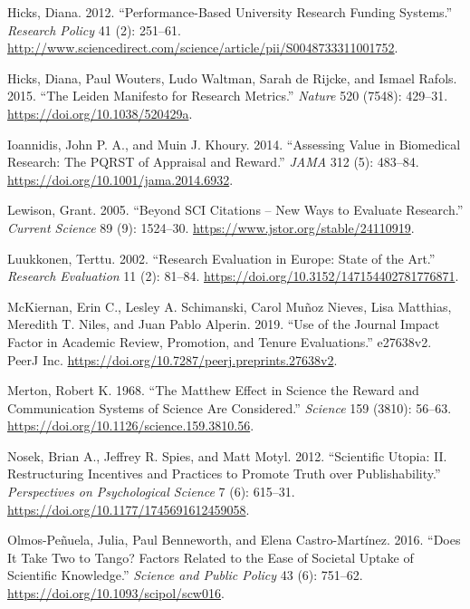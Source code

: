 \documentclass[]{elsarticle} %
\begin{document}
\leavevmode\hypertarget{ref-hicksPerformancebasedUniversityResearch2012}{}%
Hicks, Diana. 2012. ``Performance-Based University Research Funding
Systems.'' \emph{Research Policy} 41 (2): 251--61.
\url{http://www.sciencedirect.com/science/article/pii/S0048733311001752}.

\leavevmode\hypertarget{ref-hicksLeidenManifestoResearch2015}{}%
Hicks, Diana, Paul Wouters, Ludo Waltman, Sarah de Rijcke, and Ismael
Rafols. 2015. ``The Leiden Manifesto for Research Metrics.''
\emph{Nature} 520 (7548): 429--31.
\url{https://doi.org/10.1038/520429a}.

\leavevmode\hypertarget{ref-ioannidisAssessingValueBiomedical2014}{}%
Ioannidis, John P. A., and Muin J. Khoury. 2014. ``Assessing Value in
Biomedical Research: The PQRST of Appraisal and Reward.'' \emph{JAMA}
312 (5): 483--84. \url{https://doi.org/10.1001/jama.2014.6932}.

\leavevmode\hypertarget{ref-lewisonSCICitationsNew2005}{}%
Lewison, Grant. 2005. ``Beyond SCI Citations -- New Ways to Evaluate
Research.'' \emph{Current Science} 89 (9): 1524--30.
\url{https://www.jstor.org/stable/24110919}.

\leavevmode\hypertarget{ref-luukkonenResearchEvaluationEurope2002}{}%
Luukkonen, Terttu. 2002. ``Research Evaluation in Europe: State of the
Art.'' \emph{Research Evaluation} 11 (2): 81--84.
\url{https://doi.org/10.3152/147154402781776871}.

\leavevmode\hypertarget{ref-mckiernanUseJournalImpact2019}{}%
McKiernan, Erin C., Lesley A. Schimanski, Carol Muñoz Nieves, Lisa
Matthias, Meredith T. Niles, and Juan Pablo Alperin. 2019. ``Use of the
Journal Impact Factor in Academic Review, Promotion, and Tenure
Evaluations.'' e27638v2. PeerJ Inc.
\url{https://doi.org/10.7287/peerj.preprints.27638v2}.

\leavevmode\hypertarget{ref-mertonMatthewEffectScience1968}{}%
Merton, Robert K. 1968. ``The Matthew Effect in Science the Reward and
Communication Systems of Science Are Considered.'' \emph{Science} 159
(3810): 56--63. \url{https://doi.org/10.1126/science.159.3810.56}.

\leavevmode\hypertarget{ref-nosekScientificUtopiaII2012}{}%
Nosek, Brian A., Jeffrey R. Spies, and Matt Motyl. 2012. ``Scientific
Utopia: II. Restructuring Incentives and Practices to Promote Truth over
Publishability.'' \emph{Perspectives on Psychological Science} 7 (6):
615--31. \url{https://doi.org/10.1177/1745691612459058}.

\leavevmode\hypertarget{ref-olmos-penuelaDoesItTake2016}{}%
Olmos-Peñuela, Julia, Paul Benneworth, and Elena Castro-Martínez. 2016.
``Does It Take Two to Tango? Factors Related to the Ease of Societal
Uptake of Scientific Knowledge.'' \emph{Science and Public Policy} 43
(6): 751--62. \url{https://doi.org/10.1093/scipol/scw016}.
\end{document}
